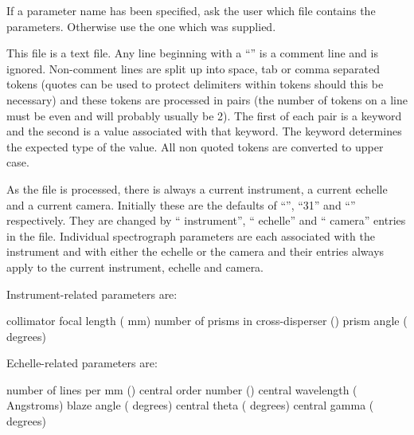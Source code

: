 \begin{manroutinedescription}
     If a parameter name has been specified, ask the user which file contains
     the parameters. Otherwise use the one which was supplied.

     This file is a text file. Any line beginning with a ``{\mantt{!}}'' is a %
comment line
     and is ignored. Non-comment lines are split up into space, tab or comma
     separated tokens (quotes can be used to protect delimiters within tokens
     should this be necessary) and these tokens are processed in pairs (the
     number of tokens on a line must be even and will probably usually be 2).
     The first of each pair is a keyword and the second is a value associated
     with that keyword. The keyword determines the expected type of the value.
     All non quoted tokens are converted to upper case.

     As the file is processed, there is always a current instrument, a current
     echelle and a current camera. Initially these are the defaults of
     ``{}'', ``31'' and ``{}'' respectively. They are %
changed by
     ``{} instrument'', ``{} echelle'' and ``{%
} camera'' entries in
     the file. Individual spectrograph parameters are each associated with the
     instrument and with either the echelle or the camera and their entries
     always apply to the current instrument, echelle and camera.

     Instrument-related parameters are:

\begin{mandescription}
   collimator focal length ({} mm)
    number of prisms in cross-disperser ({})
  prism angle ({} degrees)

\end{mandescription}
     Echelle-related parameters are:

\begin{mandescription}
      number of lines per mm ({})
     central order number ({})
  central wavelength ({} Angstroms)
 blaze angle ({} degrees)
 central theta ({} degrees)
 central gamma ({} degrees)


\end{mandescription}
\end{manroutinedescription}
